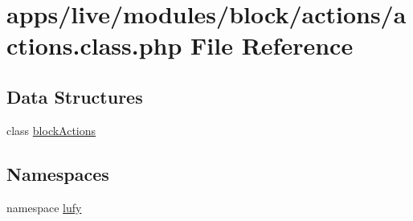\hypertarget{live_2modules_2block_2actions_2actions_8class_8php}{\section{apps/live/modules/block/actions/actions.class.\-php File Reference}
\label{live_2modules_2block_2actions_2actions_8class_8php}
}
\subsection*{Data Structures}
\begin{DoxyCompactItemize}
\item 
class \hyperlink{classblock_actions}{block\-Actions}
\end{DoxyCompactItemize}
\subsection*{Namespaces}
\begin{DoxyCompactItemize}
\item 
namespace \hyperlink{namespacelufy}{lufy}
\end{DoxyCompactItemize}
